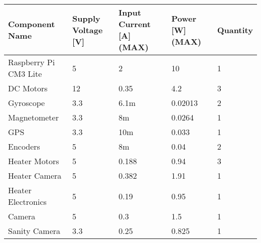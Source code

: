 
\begin{center}
\begin{table}[H]
\begin{tabular}{|m{}|m{}|m{}|m{}|m{}|}
\hline
\textbf{Component Name} & \textbf{Supply Voltage {[}V{]}} & \textbf{Input Current {[}A{]} (MAX)} & \textbf{Power {[}W{]} (MAX)} & \textbf{Quantity} \\ \hline
Raspberry Pi CM3 Lite   & 5                               & 2                                   & 10                           & 1                 \\ \hline
DC Motors               & 12                              & 0.35                                & 4.2                          & 3                 \\ \hline
Gyroscope               & 3.3                             & 6.1m                                & 0.02013                      & 2                 \\ \hline
Magnetometer            & 3.3                             & 8m                                  & 0.0264                     & 1                 \\ \hline
GPS                     & 3.3                             & 10m                                 & 0.033                        & 1                 \\ \hline
Encoders                & 5                               & 8m                                  & 0.04                         & 2                 \\ \hline
Heater Motors           & 5                               & 0.188                               & 0.94                         & 3                 \\ \hline
Heater Camera           & 5                               & 0.382                               & 1.91                         & 1                 \\ \hline
Heater Electronics      & 5                               & 0.19                                & 0.95                         & 1                 \\ \hline
Camera                  & 5                               & 0.3                                 & 1.5                          & 1                 \\ \hline
Sanity Camera           & 3.3                             & 0.25                                & 0.825                        & 1                 \\ \hline

\end{tabular}
\end{table}
\end{center}
